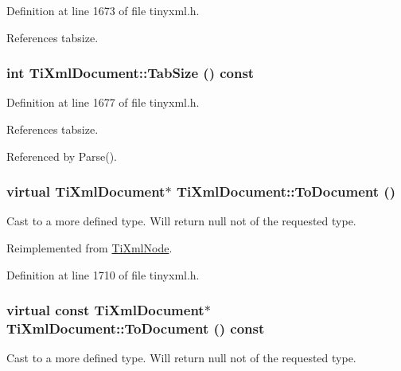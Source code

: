 Definition at line 1673 of file tinyxml.h.

References tabsize.\hypertarget{class_ti_xml_document_a612360241b85bad0826b2a9ae9cda561}{
\subsubsection[{TabSize}]{\setlength{\rightskip}{0pt plus 5cm}int TiXmlDocument::TabSize () const}}
\label{class_ti_xml_document_a612360241b85bad0826b2a9ae9cda561}


Definition at line 1677 of file tinyxml.h.

References tabsize.

Referenced by Parse().\hypertarget{class_ti_xml_document_a1025d942a1f328fd742d545e37efdd42}{
\subsubsection[{ToDocument}]{\setlength{\rightskip}{0pt plus 5cm}virtual {\bf TiXmlDocument}$\ast$ TiXmlDocument::ToDocument ()}}
\label{class_ti_xml_document_a1025d942a1f328fd742d545e37efdd42}


Cast to a more defined type. Will return null not of the requested type. 

Reimplemented from \hyperlink{class_ti_xml_node_a6a4c8ac28ee7a745d059db6691e03bae}{TiXmlNode}.

Definition at line 1710 of file tinyxml.h.\hypertarget{class_ti_xml_document_a1dc977bde3e4fe85a8eb9d88a35ef5a4}{
\subsubsection[{ToDocument}]{\setlength{\rightskip}{0pt plus 5cm}virtual const {\bf TiXmlDocument}$\ast$ TiXmlDocument::ToDocument () const}}
\label{class_ti_xml_document_a1dc977bde3e4fe85a8eb9d88a35ef5a4}


Cast to a more defined type. Will return null not of the requested type. 

